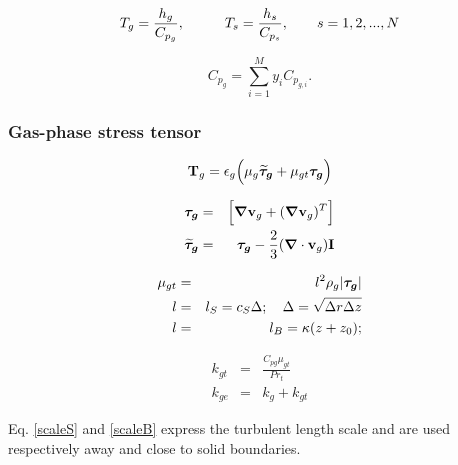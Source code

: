 \begin{equation}
T_{g}=\frac{h_{g}}{C_{p_{g}}}, 
\hspace{10mm} T_{s}=\frac{h_{s}}{C_{p_{s}}}, \qquad s=1,2,...,N
\label{eq:caloric_eos}
\end{equation}

\begin{equation}
C_{p_{g}}=\sum_{i=1}^{M}y _{i} C_{p_{g,i}}.
\label{eq:gas_cp}
\end{equation}
 
\subsubsection{\hspace{1cm}Gas-phase stress tensor}

\begin{equation} 
{\bf T}_{g}= \epsilon_{g}\Big( \mu_{g} \mbox{\boldmath $\widetilde{\tau}_{g}$} +
             \mu_{gt}\mbox{\boldmath ${\tau}_{g}$} \Big)
\label{eq:gas_stress}
\end{equation}

\begin{eqnarray}
\mbox{\boldmath ${\tau}_{g}$} & = & \Big[\mbox{\boldmath $\nabla$}
{\bf v}_{g}+ (\mbox{\boldmath $\nabla$}{\bf v}_{g})^{T}\Big] \\
\mbox{\boldmath $\widetilde {\tau}_{g}$} & = & \mbox{\boldmath ${\tau}_{g}$} - 
      \frac{2}{3}(\mbox{\boldmath $\nabla$}\cdot{\bf v}_{g}){\bf I} \\
\label{eq:strain}
\end{eqnarray}

\begin{eqnarray} 
\mu_{gt} & = & l^2 \rho_g |\mbox{\boldmath ${\tau}_{g}$}| \\ 
\label{eq:gas_mu}
l & = & l_S = c_S \Delta ; \quad \Delta = \sqrt{\Delta r \Delta z}
\label{scaleS}\\
l & = & l_B = \kappa (z + z_0); 
\label{scaleB}
\end{eqnarray}

\begin{eqnarray}
k_{gt} & = & \frac{C_{pg}\mu_{gt}}{Pr_t} \\
k_{ge} & = & k_{g} + k_{gt}
\label{eq:prandtl}
\end{eqnarray}

Eq. \ref{scaleS} and \ref{scaleB} express the turbulent length scale and
are used respectively away and close to solid boundaries.
